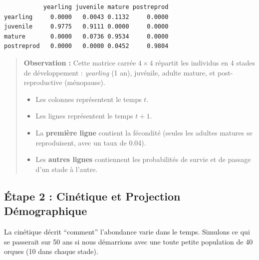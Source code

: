 \documentclass[
  french,
  a4paper,
  DIV=11,
  numbers=noendperiod,
  oneside]{scrreprt}
\newenvironment{Shaded}{}{}
\newcommand{\AttributeTok}[1]{\textcolor[rgb]{0.84,0.23,0.29}{#1}}
\newcommand{\CommentTok}[1]{\textcolor[rgb]{0.42,0.45,0.49}{#1}}
\newcommand{\DecValTok}[1]{\textcolor[rgb]{0.00,0.36,0.77}{#1}}
\newcommand{\FunctionTok}[1]{\textcolor[rgb]{0.44,0.26,0.76}{#1}}
\newcommand{\NormalTok}[1]{\textcolor[rgb]{0.14,0.16,0.18}{#1}}
\newcommand{\OtherTok}[1]{\textcolor[rgb]{0.44,0.26,0.76}{#1}}
\newcommand{\SpecialCharTok}[1]{\textcolor[rgb]{0.00,0.36,0.77}{#1}}
\newcommand{\StringTok}[1]{\textcolor[rgb]{0.01,0.18,0.38}{#1}}
\begin{document}
\begin{verbatim}
           yearling juvenile mature postreprod
yearling     0.0000   0.0043 0.1132     0.0000
juvenile     0.9775   0.9111 0.0000     0.0000
mature       0.0000   0.0736 0.9534     0.0000
postreprod   0.0000   0.0000 0.0452     0.9804
\end{verbatim}

\begin{quote}
\textbf{Observation :} Cette matrice carrée \(4 \times 4\) répartit les
individus en 4 stades de développement : \emph{yearling} (1 an),
juvénile, adulte mature, et post-reproductive (ménopause).

\begin{itemize}
\item
  Les colonnes représentent le temps \(t\).
\item
  Les lignes représentent le temps \(t+1\).
\item
  La \textbf{première ligne} contient la fécondité (seules les adultes
  matures se reproduisent, avec un taux de 0.04).
\item
  Les \textbf{autres lignes} contiennent les probabilités de survie et
  de passage d'un stade à l'autre.
\end{itemize}
\end{quote}

\subsection{Étape 2 : Cinétique et Projection
Démographique}\label{uxe9tape-2-cinuxe9tique-et-projection-duxe9mographique}

La cinétique décrit ``comment'' l'abondance varie dans le temps.
Simulons ce qui se passerait sur 50 ans si nous démarrions avec une
toute petite population de 40 orques (10 dans chaque stade).

\begin{Shaded}
\end{Shaded}
\end{document}
